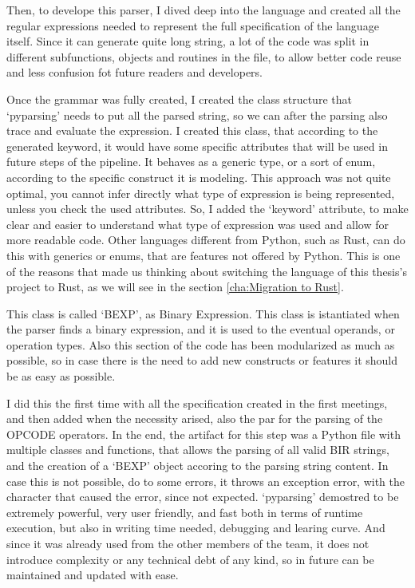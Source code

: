 Then, to develope this parser, I dived deep into the language and created all
the regular expressions needed to represent the full specification of the
language itself. Since it can generate quite long string, a lot of the code was
split in different subfunctions, objects and routines in the file, to allow
better code reuse and less confusion fot future readers and developers.

Once the grammar was fully created, I created the class structure that `pyparsing'
needs to put all the parsed string, so we can after the parsing also trace and
evaluate the expression. I created this class, that according to the generated
keyword, it would have some specific attributes that will be used in future steps
of the pipeline. It behaves as a generic type, or a sort of enum, according to
the specific construct it is modeling. This approach was not quite optimal, you
cannot infer directly what type of expression is being represented, unless you check
the used attributes. So, I added the `keyword' attribute, to make clear and
easier to understand what type of expression was used and allow for more
readable code. Other languages different from Python, such as Rust, can do this with
generics or enums, that are features not offered by Python. This is one of the reasons
that made us thinking about switching the language of this thesis's project to Rust,
as we will see in the section \ref{cha:Migration to Rust}.

This class is called `BEXP', as Binary Expression. This class is istantiated
when the parser finds a binary expression, and it is used to the eventual operands,
or operation types. Also this section of the code has been modularized as much as
possible, so in case there is the need to add new constructs or features it
should be as easy as possible.

I did this the first time with all the specification created in the first
meetings, and then added when the necessity arised, also the par for the parsing
of the OPCODE operators. In the end, the artifact for this step was a Python
file with multiple classes and functions, that allows the parsing of all valid BIR
strings, and the creation of a `BEXP' object accoring to the parsing string
content. In case this is not possible, do to some errors, it throws an exception
error, with the character that caused the error, since not expected. `pyparsing'
demostred to be extremely powerful, very user friendly, and fast both in terms
of runtime execution, but also in writing time needed, debugging and learing
curve. And since it was already used from the other members of the team, it does
not introduce complexity or any technical debt of any kind, so in future can be maintained
and updated with ease.


